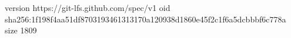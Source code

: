 version https://git-lfs.github.com/spec/v1
oid sha256:1f198f4aa51df8703193461313170a120938d1860e45f2c1f6a5dcbbbf6c778a
size 1809
